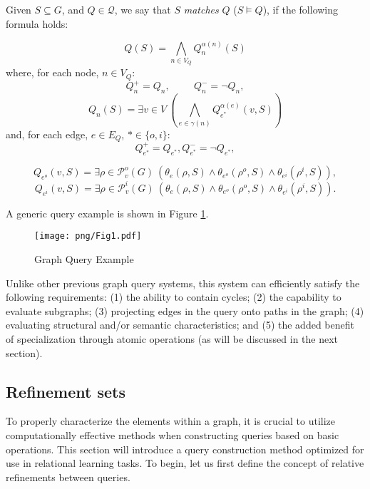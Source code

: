 \documentclass{article}%
\begin{document}
\begin{definition}{}
    Given $S\subseteq G$, and $Q\in \mathcal{Q}$, we say that $S$ \emph{matches} $Q$ ($S\vDash Q$), if the following formula holds:

    $$Q(S)=\bigwedge_{n\in V_Q} Q_n^{\alpha(n)}(S)$$
		where, for each node, $n\in V_Q$:	        
		$$Q_n^+ = Q_n,\hspace{1cm} Q_n^- = \neg Q_n,$$                	        
		$$Q_n(S)=\exists v\in V\ \left(\bigwedge_{e\in \gamma(n)} Q_{e^*}^{\alpha(e)}(v,S)\right)$$	        
	    and, for each edge, $e\in E_Q$, $*\in \{o,i\}$:
	    $$Q_{e^*}^+ = Q_{e^*}, Q_{e^*}^- = \neg Q_{e^*},$$

        $$Q_{e^o}(v,S)=\exists \rho\in \mathcal{P}_v^o(G)\ \left(\theta_e(\rho,S)\wedge \theta_{e^o}(\rho^o,S) \wedge \theta_{e^i}(\rho^i,S)\right),$$
        $$Q_{e^i}(v,S)=\exists \rho\in \mathcal{P}_v^i(G)\ \left(\theta_e(\rho,S)\wedge \theta_{e^o}(\rho^o,S) \wedge \theta_{e^i}(\rho^i,S)\right).$$

\end{definition}\medskip


A generic query example is shown in Figure \ref{abstractpqg}.

\begin{figure}[h!]
    \begin{center}
        \texttt{[image: png/Fig1.pdf]}
    \end{center}
    \caption{%
        Graph Query Example
    }%
    \label{abstractpqg}
\end{figure}

Unlike other previous graph query systems, this system can efficiently satisfy the following requirements: (1) the ability to contain cycles; (2) the capability to evaluate subgraphs; (3) projecting edges in the query onto paths in the graph; (4) evaluating structural and/or semantic characteristics; and (5) the added benefit of specialization through atomic operations (as will be discussed in the next section).

\subsection{Refinement sets}    
\label{refs}

To properly characterize the elements within a graph, it is crucial to utilize computationally effective methods when constructing queries based on basic operations. This section will introduce a query construction method optimized for use in relational learning tasks. To begin, let us first define the concept of relative refinements between queries.
\end{document}
